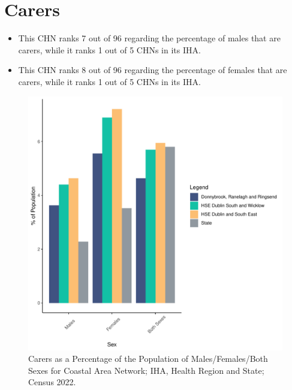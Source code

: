 \documentclass{article}
\begin{document}
\section{Carers}\label{sect:Carers}
\begin{itemize}
\item This CHN ranks  7 out of 96 regarding the percentage of males that are carers, while it ranks   1 out of 5 CHNs in its IHA.
\item This CHN ranks  8 out of 96 regarding the percentage of females that are carers, while it ranks   1 out of 5 CHNs in its IHA.
\end{itemize}
\begin{figure}[H]
	\centering
	\includegraphics[width = 150mm]{../figures/CareED.pdf}
	\caption{Carers as a Percentage of the Population of Males/Females/Both Sexes for Coastal Area Network; IHA, Health Region and State; Census 2022.}
	\label{fig:2ae19629-1a6a-13a3-e055-000000000001}
	\end{figure}
\end{document}
